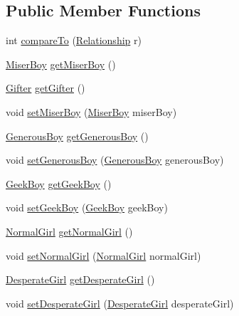 \subsection*{Public Member Functions}
\begin{DoxyCompactItemize}
\item 
int \hyperlink{class_utils_1_1_relationship_aae85aa4af5b0f4e53e2ee76935d2df12}{compare\+To} (\hyperlink{class_utils_1_1_relationship}{Relationship} r)
\item 
\hyperlink{class_boys_1_1_miser_boy}{Miser\+Boy} \hyperlink{class_utils_1_1_relationship_a05316dead31b98d76a05b762aa080756}{get\+Miser\+Boy} ()
\item 
\hyperlink{class_utils_1_1_gifter}{Gifter} \hyperlink{class_utils_1_1_relationship_a611a5918a3bd5fb8321283e48164ce67}{get\+Gifter} ()
\item 
void \hyperlink{class_utils_1_1_relationship_a7ce0f2db7408e5cbe76820c23eac20a5}{set\+Miser\+Boy} (\hyperlink{class_boys_1_1_miser_boy}{Miser\+Boy} miser\+Boy)
\item 
\hyperlink{class_boys_1_1_generous_boy}{Generous\+Boy} \hyperlink{class_utils_1_1_relationship_a6f2b8b52ddf59e09349d0d1bd4e2999f}{get\+Generous\+Boy} ()
\item 
void \hyperlink{class_utils_1_1_relationship_a371d0045e0c63ef098b60e1925227b31}{set\+Generous\+Boy} (\hyperlink{class_boys_1_1_generous_boy}{Generous\+Boy} generous\+Boy)
\item 
\hyperlink{class_boys_1_1_geek_boy}{Geek\+Boy} \hyperlink{class_utils_1_1_relationship_a3de853781b76a4244ab712ef2a7336f5}{get\+Geek\+Boy} ()
\item 
void \hyperlink{class_utils_1_1_relationship_ac46d1618cfbbb5d1651b1dafdd2b85c4}{set\+Geek\+Boy} (\hyperlink{class_boys_1_1_geek_boy}{Geek\+Boy} geek\+Boy)
\item 
\hyperlink{class_girls_1_1_normal_girl}{Normal\+Girl} \hyperlink{class_utils_1_1_relationship_a3cd3b72281befb0718232e50cb74cb30}{get\+Normal\+Girl} ()
\item 
void \hyperlink{class_utils_1_1_relationship_acbb106ec4a7792afb3e2cfc480ccc057}{set\+Normal\+Girl} (\hyperlink{class_girls_1_1_normal_girl}{Normal\+Girl} normal\+Girl)
\item 
\hyperlink{class_girls_1_1_desperate_girl}{Desperate\+Girl} \hyperlink{class_utils_1_1_relationship_af160e593b1d7a57d258e6be642f67e20}{get\+Desperate\+Girl} ()
\item 
void \hyperlink{class_utils_1_1_relationship_a6a6043667ae9f24542b2c34692a14410}{set\+Desperate\+Girl} (\hyperlink{class_girls_1_1_desperate_girl}{Desperate\+Girl} desperate\+Girl)

\end{DoxyCompactItemize}
